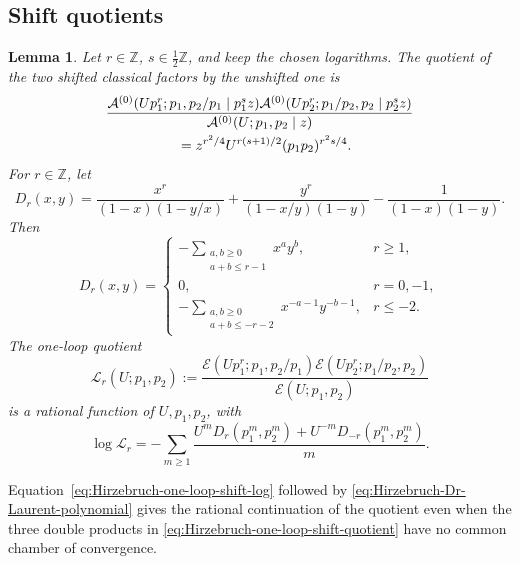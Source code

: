 \documentclass{amsart}
\newtheorem{lemma}{Lemma}
\theoremstyle{definition}
\numberwithin{equation}{section}
\newcommand{\Z}{\mathbb Z}
\begin{document}
\subsection{Shift quotients}
\begin{lemma}
\label{lem:Hirzebruch-shift-quotients}
Let \(r\in\Z\), \(s\in\tfrac12\Z\), and keep the chosen logarithms.  The quotient of the two shifted classical factors by the unshifted one is
\begin{equation}
\begin{aligned}
 &\frac{\mathcal A^{(0)}(Up_1^r;p_1,p_2/p_1\mid p_1^s z)
             \mathcal A^{(0)}(Up_2^r;p_1/p_2,p_2\mid p_2^s z)}
 {\mathcal A^{(0)}(U;p_1,p_2\mid z)}\\
 &\hspace{18mm}=
 z^{r^2/4}U^{r(s+1)/2}(p_1p_2)^{r^2s/4}.
\end{aligned}
\label{eq:Hirzebruch-classical-shift-quotient}
\end{equation}
For \(r\in\Z\), let
\begin{equation}
 D_r(x,y)=
 \frac{x^r}{(1-x)(1-y/x)}
 +\frac{y^r}{(1-x/y)(1-y)}
 -\frac1{(1-x)(1-y)}.
\label{eq:Hirzebruch-Dr-definition}
\end{equation}
Then
\begin{equation}
 D_r(x,y)=
 \begin{cases}
 -\displaystyle\sum_{\substack{a,b\geq0\\a+b\leq r-1}}x^ay^b,
     &r\geq1,\\[6pt]
 0,&r=0,-1,\\[2pt]
 -\displaystyle\sum_{\substack{a,b\geq0\\a+b\leq-r-2}}
     x^{-a-1}y^{-b-1},&r\leq-2.
 \end{cases}
\label{eq:Hirzebruch-Dr-Laurent-polynomial}
\end{equation}
The one-loop quotient
\begin{equation}
 \mathcal L_r(U;p_1,p_2)
 :=\frac{\mathcal E(Up_1^r;p_1,p_2/p_1)
             \mathcal E(Up_2^r;p_1/p_2,p_2)}
 {\mathcal E(U;p_1,p_2)}
\label{eq:Hirzebruch-one-loop-shift-quotient}
\end{equation}
is a rational function of \(U,p_1,p_2\), with
\begin{equation}
 \log\mathcal L_r
 =-\sum_{m\geq1}\frac{
 U^mD_r(p_1^m,p_2^m)+U^{-m}D_{-r}(p_1^m,p_2^m)}m.
\label{eq:Hirzebruch-one-loop-shift-log}
\end{equation}
\end{lemma}

Equation~\eqref{eq:Hirzebruch-one-loop-shift-log} followed by \eqref{eq:Hirzebruch-Dr-Laurent-polynomial} gives the rational continuation of the quotient even when the three double products in \eqref{eq:Hirzebruch-one-loop-shift-quotient} have no common chamber of convergence.
\end{document}
